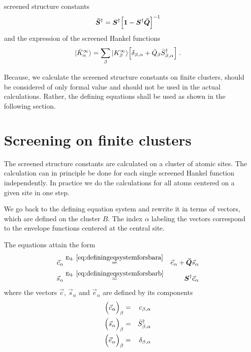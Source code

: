 \documentclass[11pt,a4paper]{report}
\begin{document}
\begin{myshadowminipage}{screened structure constants}
\begin{eqnarray}
\bm{\bar{S}}^\dagger=\bm{S}^\dagger
\Bigl[\bm{1}-\bm{S}^\dagger\bm{\bar{Q}}\Bigr]^{-1}
\label{eq:defscreenedstructureconstants}
\end{eqnarray}
and the expression of the screened Hankel functions 
\begin{eqnarray}
|\bar{K}^\infty_\alpha\rangle=\sum_\beta |K^\infty_\beta\rangle
\Bigl[\delta_{\beta,\alpha}+
\bar{Q}_\beta \bar{S}^\dagger_{\beta,\alpha}\Bigr]
\;.
\end{eqnarray}

Because, we calculate the screened structure constants on finite
clusters,  should be considered
of only formal value and should not be used in the actual
calculations. Rather, the defining equations
 shall be used as shown in the
following section.
\end{myshadowminipage}{}

\section{Screening on finite clusters}
The screened structure constants are calculated on a cluster of atomic
sites. The calculation can in principle be done for each single
screened Hankel function independently. In practice we do the
calculations for all atoms centered on a given site in one step.

We go back to the defining equation system
 and rewrite it in terms of vectors,
which are defined on the cluster $B$. The index $\alpha$ labeling the
vectors correspond to the envelope functions centered at the central
site.

The equations attain the form
\begin{eqnarray}
\vec{c}_\alpha&\eqrel{eq:definingeqsystemforsbara}{=}&
\vec{e}_\alpha+\mat{\bar{Q}}\vec{s}_\alpha
\label{eq:definingeqsystemforsbarveca}
\\
\vec{s}_\alpha&\eqrel{eq:definingeqsystemforsbarb}{=}&
\mat{S}^\dagger\vec{c}_\alpha
\label{eq:definingeqsystemforsbarvecb}
\label{eq:definingeqsystemforsbarvec}
\end{eqnarray}
where the vectors $\vec{c}$, $\vec{s}_\alpha$ and $\vec{e}_\alpha$ are
defined by its components
\begin{eqnarray}
\Bigl(\vec{c}_\alpha\Bigr)_\beta&=&c_{\beta,\alpha}
\nonumber\\
\Bigl(\vec{s}_\alpha\Bigr)_\beta&=&\bar{S}^\dagger_{\beta,\alpha}
\nonumber\\
\Bigl(\vec{e}_\alpha\Bigr)_\beta&=&\delta_{\beta,\alpha}
\end{eqnarray}
\end{document}
